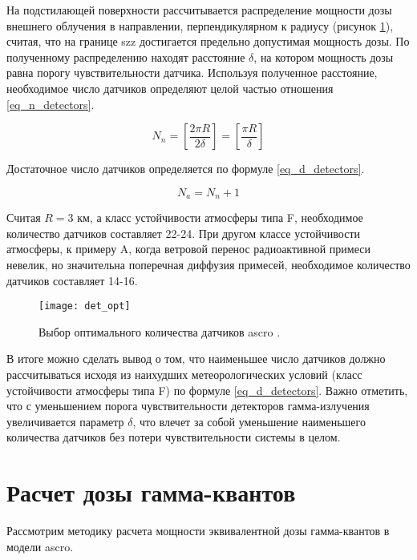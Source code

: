 На подстилающей поверхности рассчитывается распределение мощности дозы внешнего облучения в направлении, 
перпендикулярном к радиусу (рисунок \ref{fig_det_opt}), считая, что на границе \ac{szz} достигается предельно допустимая
мощность дозы. По полученному распределению находят расстояние $\delta$, на котором мощность дозы равна порогу 
чувствительности датчика. Используя полученное расстояние, необходимое число датчиков определяют целой частью отношения 
\ref{eq_n_detectors}.

\begin{equation}
    \label{eq_n_detectors}
    N_n = [\frac{2 \pi R}{2 \delta}] = [\frac{\pi R}{\delta}]
\end{equation}

Достаточное число датчиков определяется по формуле \ref{eq_d_detectors}.

\begin{equation}
    \label{eq_d_detectors}
    N_a = N_n + 1
\end{equation}

Считая $R = 3$ км, а класс устойчивости атмосферы типа F, необходимое количество датчиков составляет 22-24. При другом классе
устойчивости атмосферы, к примеру A, когда ветровой перенос радиоактивной примеси невелик, но значительна поперечная диффузия
примесей, необходимое количество датчиков составляет 14-16.

\begin{figure}[ht!]
    \centering
    \texttt{[image: det\_opt]}
    \captionsetup{justification=centering}
    \caption{Выбор оптимального количества датчиков \ac{ascro} \cite{elokhin}.}
    \label{fig_det_opt}
\end{figure}


В итоге можно сделать вывод о том, что наименьшее число датчиков должно рассчитываться исходя из наихудших метеорологических
условий (класс устойчивости атмосферы типа F) по формуле \ref{eq_d_detectors}. Важно отметить, что с уменьшением порога 
чувствительности детекторов гамма-излучения увеличивается параметр $\delta$, что влечет за собой уменьшение наименьшего
количества датчиков без потери чувствительности системы в целом.

\section{Расчет дозы гамма-квантов}

Рассмотрим методику расчета мощности эквивалентной дозы гамма-квантов в модели \ac{ascro}.

